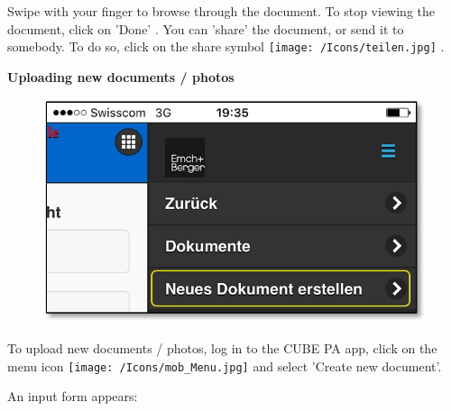 Swipe with your finger to browse through the document. To stop viewing the document, click on 'Done' . You can 'share' the document, or send it to somebody. To do so, click on the share symbol \texttt{[image: /Icons/teilen.jpg]} .

\pagebreak

\textbf{Uploading new documents / photos}

\vspace{\baselineskip}

\begin{figure}   %
  \vspace{-35pt}      %
  \begin{center}
    \includegraphics[width=1\linewidth]{../chapters/11_Dokumentenablage/pictures/11-mob03_Dokumente_hochladen.jpg}
  \end{center}
  \vspace{-20pt}
  \vspace{-10pt}
\end{figure}

To upload new documents / photos, log in to the CUBE PA app, click on the menu icon \texttt{[image: /Icons/mob\_Menu.jpg]} and select 'Create new document'.

\vspace{\baselineskip}

An input form appears:

\vspace{\baselineskip}
\vspace{\baselineskip}

